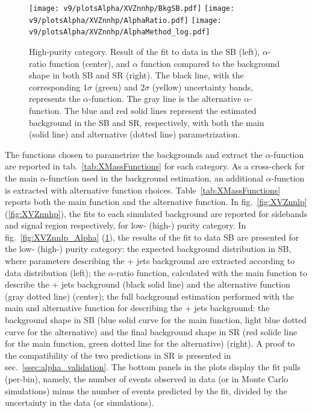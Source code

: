 \begin{figure}[!htb]
  \centering
    \texttt{[image: v9/plotsAlpha/XVZnnhp/BkgSB.pdf]}
    \texttt{[image: v9/plotsAlpha/XVZnnhp/AlphaRatio.pdf]}
    \texttt{[image: v9/plotsAlpha/XVZnnhp/AlphaMethod\_log.pdf]}
  \caption{High-purity category. Result of the fit to data in the SB (left), $\alpha$-ratio function (center), and $\alpha$ function compared to the background shape in both SB and SR (right). The black line, with the corresponding $1\sigma$ (green) and $2\sigma$ (yellow) uncertainty bands, represents the $\alpha$-function. The gray line is the alternative $\alpha$-function. The blue and red solid lines represent the estimated background in the SB and SR, respectively, with both the main (solid line) and alternative (dotted line) parametrization.}
  \label{fig:XVZnnhp_Alpha}
\end{figure}

\noindent The functions chosen to parametrize the backgrounds and extract the $\alpha$-function are reported in tab.~\ref{tab:XMassFunctions} for each category. As a cross-check for the main $\alpha$-function used in the background estimation, an additional $\alpha$-function is extracted with alternative function choices. Table~\ref{tab:XMassFunctions} reports both the main function and the alternative function. In fig.~\ref{fig:XVZnnlp} (\ref{fig:XVZnnhp}), the fits to each simulated background are reported for sidebands and signal region respectively, for low- (high-) purity category. In fig.~\ref{fig:XVZnnlp_Alpha} (\ref{fig:XVZnnhp_Alpha}), the results of the fit to data SB are presented for the low- (high-) purity category: the expected background distribution in SB, where parameters describing the \V + jets background are extracted according to data distribution (left); the $\alpha$-ratio function, calculated with the main function to describe the \V + jets background (black solid line) and the alternative function (gray dotted line) (center); the full background estimation performed with the main and alternative function for describing the \V + jets background: the background shape in SB (blue solid curve for the main function, light blue dotted curve for the alternative) and the final background shape in SR (red solide line for the main function, green dotted line for the alternative) (right). A proof to the compatibility of the two predictions in SR is presented in sec.~\ref{ssec:alpha_validation}. The bottom panels in the plots display the fit pulls (per-bin), namely, the number of events observed in data (or in Monte Carlo simulations) minus the number of events predicted by the fit, divided by the uncertainty in the data (or simulations). 





